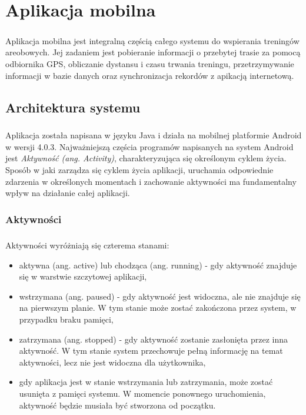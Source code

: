\chapter{Aplikacja mobilna} %
\label{cha:aplikacja_mobilna}

\paragraph{} %
\label{par:}
Aplikacja mobilna jest integralną częścią całego systemu do wspierania treningów areobowych. Jej zadaniem jest pobieranie informacji o przebytej trasie za pomocą odbiornika GPS, obliczanie dystansu i czasu trwania treningu, przetrzymywanie informacji w bazie danych oraz synchronizacja rekordów z apikacją internetową. 

\section{Architektura systemu} %
\label{sec:architektura_system}

\paragraph{} %
\label{par:}
Aplikacja została napisana w języku Java i działa na mobilnej platformie Android w wersji 4.0.3. Najważniejszą częścia programów napisanych na system Android jest \textit{Aktywność (ang. Activity)}, charakteryzująca się określonym cyklem życia. Sposób w jaki zarządza się cyklem życia aplikacji, uruchamia odpowiednie zdarzenia w określonych momentach i zachowanie aktywności ma fundamentalny wpływ na działanie całej aplikacji.

\subsection{Aktywności} %
\label{sub:aktywno_ci}

\paragraph{} %
\label{par:}
Aktywności wyróżniają się czterema stanami:
\begin{itemize}
	\item aktywna (ang. active) lub chodząca (ang. running) - gdy aktywność znajduje się w warstwie szczytowej aplikacji,
	\item wstrzymana (ang. paused) - gdy aktywność jest widoczna, ale nie znajduje się na pierwszym planie. W tym stanie może zostać zakończona przez system, w przypadku braku pamięci,
	\item zatrzymana (ang. stopped) - gdy aktywność zostanie zasłonięta przez inna aktywność. W tym stanie system przechowuje pełną informację na temat aktywności, lecz nie jest widoczna dla użytkownika,
	\item gdy aplikacja jest w stanie wstrzymania lub zatrzymania, może zostać usunięta z pamięci systemu. W momencie ponownego uruchomienia, aktywność będzie musiała być stworzona od początku.
\end{itemize}

